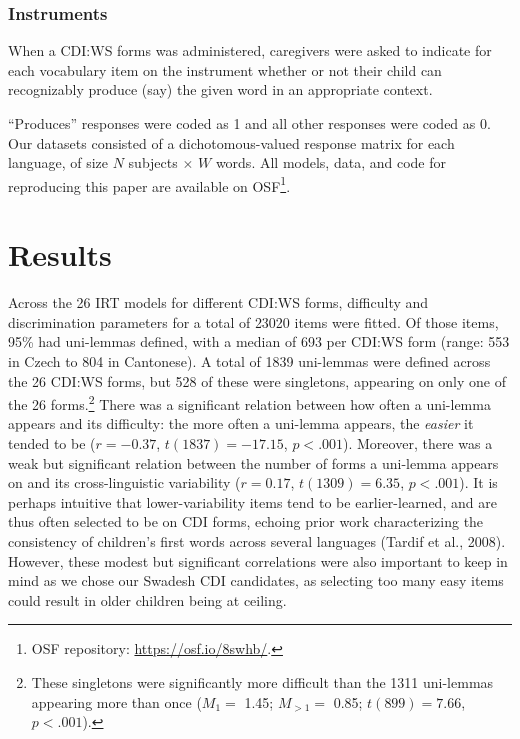 \documentclass[10pt, letterpaper]{article}
\begin{document}
\hypertarget{instruments}{%
\subsubsection{Instruments}\label{instruments}}

When a CDI:WS forms was administered, caregivers were asked to indicate
for each vocabulary item on the instrument whether or not their child
can recognizably produce (say) the given word in an appropriate context.

``Produces'' responses were coded as 1 and all other responses were
coded as 0. Our datasets consisted of a dichotomous-valued response
matrix for each language, of size \(N\) subjects \(\times\) \(W\) words.
All models, data, and code for reproducing this paper are available on
OSF\footnote{OSF repository:
  \href{https://osf.io/8swhb/?view_only=6f6ab9818f2a4bb288e05ca9e12f540c}{https://osf.io/8swhb/}.}.

\hypertarget{results}{%
\section{Results}\label{results}}

Across the 26 IRT models for different CDI:WS forms, difficulty and
discrimination parameters for a total of 23020 items were fitted. Of
those items, 95\% had uni-lemmas defined, with a median of 693 per
CDI:WS form (range: 553 in Czech to 804 in Cantonese). A total of 1839
uni-lemmas were defined across the 26 CDI:WS forms, but 528 of these
were singletons, appearing on only one of the 26
forms.\footnote{These singletons were significantly more difficult than the 1311 uni-lemmas appearing more than once ($M_1=$ 1.45; $M_{>1}=$ 0.85; $t(899)=7.66$, $p<.001$).}
There was a significant relation between how often a uni-lemma appears
and its difficulty: the more often a uni-lemma appears, the
\emph{easier} it tended to be (\(r=-0.37\), \(t(1837)=-17.15\),
\(p<.001\)). Moreover, there was a weak but significant relation between
the number of forms a uni-lemma appears on and its cross-linguistic
variability (\(r=0.17\), \(t(1309)=6.35\), \(p<.001\)). It is perhaps
intuitive that lower-variability items tend to be earlier-learned, and
are thus often selected to be on CDI forms, echoing prior work
characterizing the consistency of children's first words across several
languages (Tardif et al., 2008). However, these modest but significant
correlations were also important to keep in mind as we chose our Swadesh
CDI candidates, as selecting too many easy items could result in older
children being at ceiling.
\end{document}
